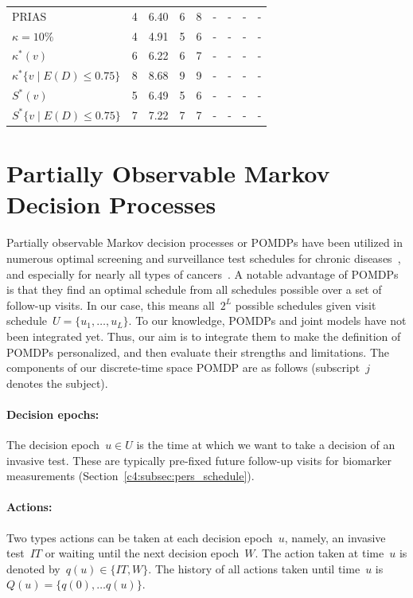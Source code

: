 \begin{subappendices}
\begin{table}
\begin{tabular}{l|rrrr|rrrr}
PRIAS          & 4  & 6.40 & 6  & 8  & - & - & - & -\\
$\kappa=10\%$  & 4  & 4.91 & 5  & 6  & - & - & - & - \\
$\kappa^*(v)$  & 6  & 6.22 & 6  & 7  & - & - & - & -\\
$\kappa^*\{v \mid E(D)\leq 0.75\}$ & 8 & 8.68 & 9  & 9  & - & - & - & -\\
$S^*(v)$  & 5  & 6.49 & 5  & 6  & - & - & - & -\\
$S^*\{v \mid E(D)\leq 0.75\}$ & 7 & 7.22 & 7  & 7  & - & - & - & -\\
\bottomrule
\end{tabular}
\end{table}

\section{Partially Observable Markov Decision Processes}
\label{c4:appendix:pomdp}
Partially observable Markov decision processes or POMDPs have been utilized in numerous optimal screening and surveillance test schedules for chronic diseases~\citep{steimle2017markov}, and especially for nearly all types of cancers~\citep{alagoz2010operations}. A notable advantage of POMDPs is that they find an optimal schedule from all schedules possible over a set of follow-up visits. In our case, this means all~$2^L$ possible schedules given visit schedule~$U = \{u_1, \ldots, u_L\}$. To our knowledge, POMDPs and joint models have not been integrated yet. Thus, our aim is to integrate them to make the definition of POMDPs personalized, and then evaluate their strengths and limitations. The components of our discrete-time space POMDP are as follows (subscript~$j$ denotes the subject).

\paragraph{\textbf{Decision epochs}:} The decision epoch~$u \in U$ is the time at which we want to take a decision of an invasive test. These are typically pre-fixed future follow-up visits for biomarker measurements (Section~\ref{c4:subsec:pers_schedule}).

\paragraph{\textbf{Actions}:} Two types actions can be taken at each decision epoch~$u$, namely, an invasive test~$IT$ or waiting until the next decision epoch~$W$. The action taken at time~$u$ is denoted by~${q(u) \in \{IT,W\}}$. The history of all actions taken until time~$u$ is~${Q(u)=\{q(0), \ldots q(u)\}}$.


\end{subappendices}

